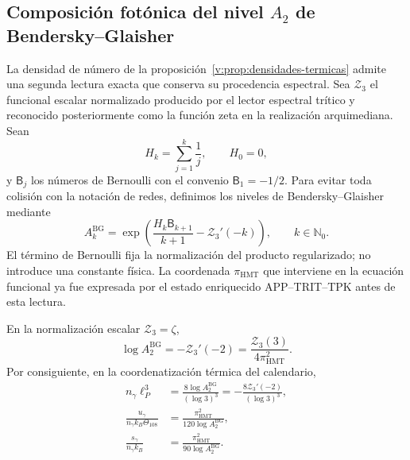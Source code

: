 \subsection{Composición fotónica del nivel \texorpdfstring{\(A_2\)}{A2} de Bendersky--Glaisher}
\label{v:subsec:bendersky-fotonica}

La densidad de número de la proposición~\ref{v:prop:densidades-termicas}
admite una segunda lectura exacta que conserva su procedencia espectral.
Sea \(\mathcal Z_3\) el funcional escalar normalizado producido por el
lector espectral trítico y reconocido posteriormente como la función zeta
en la realización arquimediana. Sean
\[
 H_k=\sum_{j=1}^{k}\frac1j,\qquad H_0=0,
\]
y \(\mathsf B_j\) los números de Bernoulli con el convenio
\(\mathsf B_1=-1/2\). Para evitar toda colisión con la notación de redes,
definimos los niveles de Bendersky--Glaisher mediante
\begin{equation}
 A_k^{\mathrm{BG}}
 =\exp\!\left(
   \frac{H_k\mathsf B_{k+1}}{k+1}-\mathcal Z_3'(-k)
 \right),\qquad k\in\mathbb N_0.
 \label{v:eq:bendersky-bg}
\end{equation}
El término de Bernoulli fija la normalización del producto regularizado;
no introduce una constante física. La coordenada
\(\pi_{\mathrm{HMT}}\) que interviene en la ecuación funcional ya fue
expresada por el estado enriquecido APP--TRIT--TPK antes de esta lectura.

\begin{proposition}
\label{v:prop:bendersky-fotonica}
En la normalización escalar \(\mathcal Z_3=\zeta\),
\begin{equation}
 \log A_2^{\mathrm{BG}}
 =-\mathcal Z_3'(-2)
 =\frac{\mathcal Z_3(3)}{4\pi_{\mathrm{HMT}}^2}.
 \label{v:eq:bendersky-nivel-dos}
\end{equation}
Por consiguiente, en la coordenatización térmica del calendario,
\begin{align}
 n_\gamma\ell_P^3
  &=\frac{8\log A_2^{\mathrm{BG}}}{(\log3)^3}
   =-\frac{8\mathcal Z_3'(-2)}{(\log3)^3},
   \label{v:eq:numero-fotones-bendersky}\\
 \frac{u_\gamma}{n_\gamma k_B\Theta_{108}}
  &=\frac{\pi_{\mathrm{HMT}}^2}{120\log A_2^{\mathrm{BG}}},
   \label{v:eq:energia-media-bendersky}\\
 \frac{s_\gamma}{n_\gamma k_B}
  &=\frac{\pi_{\mathrm{HMT}}^2}{90\log A_2^{\mathrm{BG}}}.
   \label{v:eq:entropia-media-bendersky}
\end{align}
\end{proposition}

